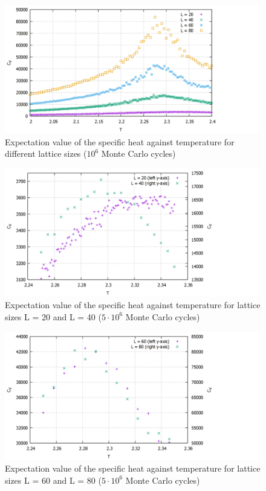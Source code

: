 \documentclass[10pt,a4paper]{article}
\begin{document}
\begin{figure}[h]
	\includegraphics[scale = 0.25]{cv_all.png}
	\centering
	\caption{Expectation value of the specific heat against temperature for different lattice sizes ($10^6$ Monte Carlo cycles)}
	\label{cv_all}
\end{figure}

\begin{figure}[h]
	\includegraphics[scale = 0.25]{cv2040.png}
	\centering
	\caption{Expectation value of the specific heat against temperature for lattice sizes L = 20 and L = 40 ($5 \cdot 10^6$ Monte Carlo cycles)}
	\label{cv2040}
\end{figure}

\begin{figure}[h]
	\includegraphics[scale = 0.25]{cv6080.png}
	\centering
	\caption{Expectation value of the specific heat against temperature for lattice sizes L = 60 and L = 80 ($5 \cdot 10^6$ Monte Carlo cycles)}
	\label{cv6080}
\end{figure}
\end{document}
